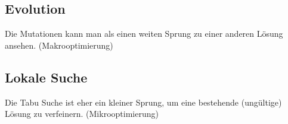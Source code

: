   \subsection{Evolution}
    Die Mutationen kann man als einen weiten Sprung zu einer anderen Lösung ansehen. (Makrooptimierung)
  \subsection{Lokale Suche}
    Die Tabu Suche ist eher ein kleiner Sprung, um eine bestehende (ungültige) Lösung zu verfeinern. (Mikrooptimierung)

